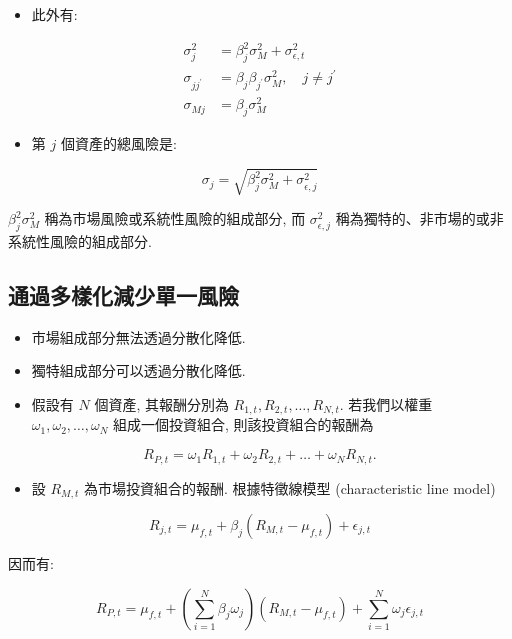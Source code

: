 \documentclass[letterpaper]{article}
\begin{document}
		\begin{itemize}
			\item 此外有: 
		\end{itemize}
		
		$$
		\begin{aligned}
			\sigma_{j}^{2} & =\beta_{j}^{2} \sigma_{M}^{2}+\sigma_{\epsilon, t}^{2} \\
			\sigma_{j j^{\prime}} & =\beta_{j} \beta_{j^{\prime}} \sigma_{M}^{2}, \quad j \neq j^{\prime} \\
			\sigma_{M j} & =\beta_{j} \sigma_{M}^{2}
		\end{aligned}
		$$
		
		\begin{itemize}
			\item 第 \( j \) 個資產的總風險是: 
		\end{itemize}
		
		$$
		\sigma_{j}=\sqrt{\beta_{j}^{2} \sigma_{M}^{2}+\sigma_{\epsilon, j}^{2}}
		$$
		
		$\beta_{j}^{2} \sigma_{M}^{2}$ 稱為市場風險或系統性風險的組成部分, 而 $\sigma_{\epsilon, j}^{2}$ 稱為獨特的、非市場的或非系統性風險的組成部分. 
		
		
		\subsection{通過多樣化減少單一風險}
		\begin{itemize}
			\item 市場組成部分無法透過分散化降低. 
			\item 獨特組成部分可以透過分散化降低. 
			\item 假設有 $N$ 個資產, 其報酬分別為 $R_{1, t}, R_{2, t}, \ldots, R_{N, t}$. 若我們以權重 $\omega_{1}, \omega_{2}, \ldots, \omega_{N}$ 組成一個投資組合, 則該投資組合的報酬為
		\end{itemize}
		
		
		$$
		R_{P, t}=\omega_{1} R_{1, t}+\omega_{2} R_{2, t}+\ldots+\omega_{N} R_{N, t} .
		$$
		
		\begin{itemize}
			\item 設 $R_{M, t}$ 為市場投資組合的報酬. 根據特徵線模型 (characteristic line model) 
		\end{itemize}
		
		
		$$
		R_{j, t}=\mu_{f, t}+\beta_{j}\left (R_{M, t}-\mu_{f, t}\right) +\epsilon_{j, t}
		$$
		
		因而有: 
		
		$$
		R_{P, t}=\mu_{f, t}+\left (\sum_{i=1}^{N} \beta_{j} \omega_{j}\right) \left (R_{M, t}-\mu_{f, t}\right) +\sum_{i=1}^{N} \omega_{j} \epsilon_{j, t}
		$$
		
\end{document}
